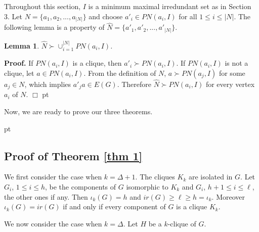 \documentclass[11pt]{article}
\newtheorem{lem}{Lemma}
\newcommand{\qed}{$\Box$}
\newcommand{\proof}{\noindent\textbf{Proof. }}
\newcommand{\2}{ \vspace{0.2cm} }
\newcommand{\1}{ \vspace{0.1cm} }
\begin{document}
Throughout this section,
$I$ is a minimum maximal irredundant set as in Section 3.
Let $N = \{a_{1}, a_{2}, ..., a_{|N|}\}$ and choose $a'_{i} \in PN(a_{i}, I)$ for all $1 \leq i \leq |N|$.
The following lemma is a property of
$\hat{N} = \{a'_{1}, a'_{2}, ..., a'_{|N|}\}$.

\begin{lem}\label{l1}
$\hat{N} \succ \cup^{|N|}_{i = 1}PN(a_{i}, I)$.
\end{lem}
\proof
 If $PN(a_{i}, I)$ is a clique, then $a'_{i} \succ PN(a_{i}, I)$.
If $PN(a_{i}, I)$ is not a clique, let $a\in PN(a_i,I)$. From the definition of $N$, $a \succ PN(a_j,I)$ for some $a_j \in N$, which implies $a'_ja \in E(G)$. Therefore
$\hat{N} \succ PN(a_{i}, I)$ for every vertex $a_i$ of $N$.
\qed
{} pt

\indent Now, we are ready to prove our three theorems.

 pt


\subsection{Proof of Theorem \ref{thm 1}}
We first consider the case when $k = \Delta + 1$. The cliques $K_k$ are isolated in $G$. Let $G_i$, $1\le i\le h$, be the components of $G$ isomorphic to $K_k$ and $G_i$, $h+1\le i\le \ell$, the other ones if any. Then $\iota _k(G)=h$ and $ir(G)\ge \ell \ge h =\iota_k$. Moreover $\iota_k(G)=ir(G)$ if and only if every component of $G$ is a clique $K_k$.





We now consider the case when $k = \Delta$.
Let $H$ be a $k$-clique of $G$.
\end{document}
